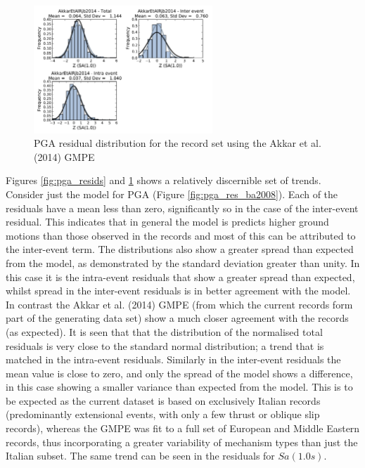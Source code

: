 \begin{figure}[htb]
	\centering
		\includegraphics[width=0.6\textwidth]{./figures/residuals/Akkar2014_Residuals_Sa1.pdf}
	\caption{PGA residual distribution for the record set using the Akkar et al. (2014) GMPE}
	\label{fig:sa1_res_akkar2014}
\end{figure}

Figures \ref{fig:pga_resids} and \ref{fig:sa1_res_akkar2014} shows a relatively discernible set of trends. Consider just the \cite{boore2008} model for PGA (Figure \ref{fig:pga_res_ba2008}). Each of the residuals have a mean less than zero, significantly so in the case of the inter-event residual. This indicates that in general the \cite{boore2008} model is predicts higher ground motions than those observed in the records and most of this can be attributed to the inter-event term. The distributions also show a greater spread than expected from the model, as demonstrated by the standard deviation greater than unity. In this case it is the intra-event residuals that show a greater spread than expected, whilst spread in the inter-event residuals is in better agreement with the model. In contrast the Akkar et al. (2014)  GMPE (from which the current records form part of the generating data set) show a much closer agreement with the records (as expected). It is seen that that the distribution of the normalised total residuals is very close to the standard normal distribution; a trend that is matched in the intra-event residuals. Similarly in the inter-event residuals the mean value is close to zero, and only the spread of the model shows a difference, in this case showing a smaller variance than expected from the model. This is to be expected as the current dataset is based on exclusively Italian records (predominantly extensional events, with only a few thrust or oblique slip records), whereas the GMPE was fit to a full set of European and Middle Eastern records, thus incorporating a greater variability of mechanism types than just the Italian subset. The same trend can be seen in the residuals for $Sa \left( {1.0 s} \right)$. 

